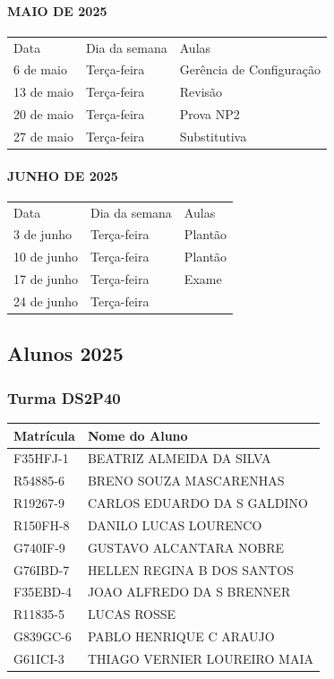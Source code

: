 \documentclass[
]{book}
\begin{document}
\paragraph{MAIO DE 2025}\label{maio-de-2025}

\begin{longtable}[]{@{}lll@{}}
\toprule\noalign{}
\endhead
\bottomrule\noalign{}
\endlastfoot
Data & Dia da semana & Aulas \\
6 de maio & Terça-feira & Gerência de Configuração \\
13 de maio & Terça-feira & Revisão \\
20 de maio & Terça-feira & Prova NP2 \\
27 de maio & Terça-feira & Substitutiva \\
\end{longtable}

\paragraph{JUNHO DE 2025}\label{junho-de-2025}

\begin{longtable}[]{@{}lll@{}}
\toprule\noalign{}
\endhead
\bottomrule\noalign{}
\endlastfoot
Data & Dia da semana & Aulas \\
3 de junho & Terça-feira & Plantão \\
10 de junho & Terça-feira & Plantão \\
17 de junho & Terça-feira & Exame \\
24 de junho & Terça-feira & \\
\end{longtable}

\subsection{Alunos 2025}\label{alunos-2025}

\subsubsection{Turma DS2P40}\label{turma-ds2p40}

\begin{longtable}[]{@{}ll@{}}
\toprule\noalign{}
Matrícula & Nome do Aluno \\
\midrule\noalign{}
\endhead
\bottomrule\noalign{}
\endlastfoot
F35HFJ-1 & BEATRIZ ALMEIDA DA SILVA \\
R54885-6 & BRENO SOUZA MASCARENHAS \\
R19267-9 & CARLOS EDUARDO DA S GALDINO \\
R150FH-8 & DANILO LUCAS LOURENCO \\
G740IF-9 & GUSTAVO ALCANTARA NOBRE \\
G76IBD-7 & HELLEN REGINA B DOS SANTOS \\
F35EBD-4 & JOAO ALFREDO DA S BRENNER \\
R11835-5 & LUCAS ROSSE \\
G839GC-6 & PABLO HENRIQUE C ARAUJO \\
G61ICI-3 & THIAGO VERNIER LOUREIRO MAIA \\
\end{longtable}
\end{document}
